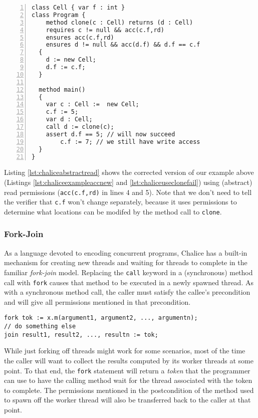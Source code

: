 \begin{lstlisting}[language=Chalice,float,caption={Corrected example using abstract read permissions},label={lst:chaliceabstractread},numbers=left]
class Cell { var f : int }
class Program {
 	method clone(c : Cell) returns (d : Cell)
    requires c != null && acc(c.f,rd)
    ensures acc(c.f,rd)
    ensures d != null && acc(d.f) && d.f == c.f
  {
    d := new Cell;
    d.f := c.f;
  }

  method main()
  {
    var c : Cell :=  new Cell;
    c.f := 5;
    var d : Cell;
    call d := clone(c);
    assert d.f == 5; // will now succeed
		c.f := 7; // we still have write access
  }
}
\end{lstlisting}

Listing \ref{lst:chaliceabstractread} shows the corrected version of our example above (Listings \ref{lst:chaliceexampleaccnew} and \ref{lst:chaliceuseclonefail}) using (abstract) read permissions (\lstinline!acc(c.f,rd)! in lines 4 and 5). 
Note that we don't need to tell the verifier that \lstinline!c.f! won't change separately, because it uses permissions to determine what locations can be modifed by the method call to \lstinline!clone!.

\subsubsection{Fork-Join}
As a language devoted to encoding concurrent programs, Chalice has a built-in mechanism for creating new threads and waiting for threads to complete in the familiar \emph{fork-join} model.
Replacing the \lstinline[language=Chalice]!call! keyword in a (synchronous) method call with \lstinline[language=Chalice]!fork! causes that method to be executed in a newly spawned thread.
As with a synchronous method call, the caller must satisfy the callee's precondition and will give all permissions mentioned in that precondition.

\begin{lstlisting}[language=Chalice]
fork tok := x.m(argument1, argument2, ..., argumentn);
// do something else
join result1, result2, ..., resultn := tok;
\end{lstlisting}

While just forking off threads might work for some scenarios, most of the time the caller will want to collect the results computed by its worker threads at some point.
To that end, the \lstinline[language=Chalice]!fork! statement will return a \emph{token} that the programmer can use to have the calling method wait for the thread associated with the token to complete.
The permissions mentioned in the postcondition of the method used to spawn off the worker thread will also be transferred back to the caller at that point.

